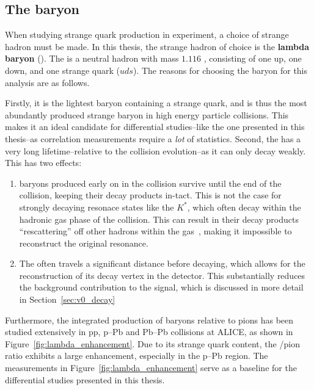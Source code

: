 \subsection{The \lmb baryon}
\label{sec:lambda_baryon}

When studying strange quark production in experiment, a choice of strange hadron must be made. In this thesis, the strange hadron of choice is the \textbf{lambda baryon} (\lmb). The \lmb is a neutral hadron with mass $1.116$ \GeVmass, consisting of one up, one down, and one strange quark ($uds$). The reasons for choosing the \lmb baryon for this analysis are as follows.

Firstly, it is the lightest baryon containing a strange quark, and is thus the most abundantly produced strange baryon in high energy particle collisions. This makes it an ideal candidate for differential studies--like the one presented in this thesis--as correlation measurements require a \textit{lot} of statistics. Second, the \lmb has a very long lifetime--relative to the collision evolution--as it can only decay weakly. This has two effects:
\begin{enumerate}
    \item \lmb baryons produced early on in the collision survive until the end of the collision, keeping their decay products in-tact. This is not the case for strongly decaying resonace states like the $K^*$, which often decay within the hadronic gas phase of the collision. This can result in their decay products ``rescattering'' off other hadrons within the gas~\cite{Rescatter}, making it impossible to reconstruct the original resonance.
    \item The \lmb often travels a significant distance before decaying, which allows for the reconstruction of its decay vertex in the detector. This substantially reduces the background contribution to the \lmb signal, which is discussed in more detail in Section~\ref{sec:v0_decay}
\end{enumerate}
Furthermore, the integrated production of \lmb baryons relative to pions has been studied extensively in pp, p--Pb and Pb--Pb collisions at ALICE, as shown in Figure~\ref{fig:lambda_enhancement}. Due to its strange quark content, the \lmb/pion ratio exhibits a large enhancement, especially in the p--Pb region. The measurements in Figure~\ref{fig:lambda_enhancement} serve as a baseline for the differential studies presented in this thesis.

